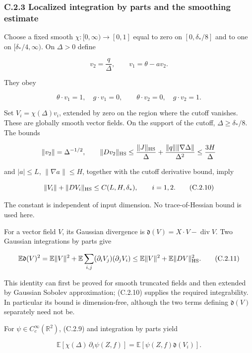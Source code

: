 \documentclass[
  11pt,
  a4paper,
]{article}
\begin{document}
\hypertarget{c.2.3-localized-integration-by-parts-and-the-smoothing-estimate}{%
\subsubsection{C.2.3 Localized integration by parts and the smoothing
estimate}\label{c.2.3-localized-integration-by-parts-and-the-smoothing-estimate}}

Choose a fixed smooth \(\chi:[0,\infty)\to[0,1]\) equal to zero on
\([0,\delta_*/8]\) and to one on \([\delta_*/4,\infty)\). On
\(\Delta>0\) define

\[
v_2=\frac q\Delta,\qquad
v_1=\theta-a v_2.
\]

They obey

\[
\theta\cdot v_1=1,\quad g\cdot v_1=0,
\qquad
\theta\cdot v_2=0,\quad g\cdot v_2=1.
\tag{C.2.9}
\]

Set \(V_i=\chi(\Delta)v_i\), extended by zero on the region where the
cutoff vanishes. These are globally smooth vector fields. On the support
of the cutoff, \(\Delta\ge\delta_*/8\). The bounds

\[
\|v_2\|=\Delta^{-1/2},\qquad
\|Dv_2\|_{\rm HS}
 \le\frac{\|J\|_{\rm HS}}\Delta
       +\frac{\|q\|\|\nabla\Delta\|}{\Delta^2}
 \le\frac{3H}\Delta
\]

and \(|a|\le L\), \(\|\nabla a\|\le H\), together with the cutoff
derivative bound, imply

\[
\|V_i\|+\|DV_i\|_{\rm HS}
 \le C(L,H,\delta_*),\qquad i=1,2.
\tag{C.2.10}
\]

The constant is independent of input dimension. No trace-of-Hessian
bound is used here.

For a vector field \(V\), its Gaussian divergence is
\(\mathfrak d(V)=X\cdot V-\operatorname{div}V\). Two Gaussian
integrations by parts give

\[
\mathbb E\mathfrak d(V)^2
 =\mathbb E\|V\|^2
   +\mathbb E\sum_{i,j}(\partial_iV_j)(\partial_jV_i)
 \le\mathbb E\|V\|^2+\mathbb E\|DV\|_{\rm HS}^2.
\tag{C.2.11}
\]

This identity can first be proved for smooth truncated fields and then
extended by Gaussian Sobolev approximation; (C.2.10) supplies the
required integrability. In particular its bound is dimension-free,
although the two terms defining \(\mathfrak d(V)\) separately need not
be.

For \(\psi\in C_c^\infty(\mathbb R^2)\), (C.2.9) and integration by
parts yield

\[
\mathbb E[\chi(\Delta)\,\partial_i\psi(Z,f)]
 =\mathbb E[\psi(Z,f)\mathfrak d(V_i)].
\tag{C.2.12}
\]
\end{document}
